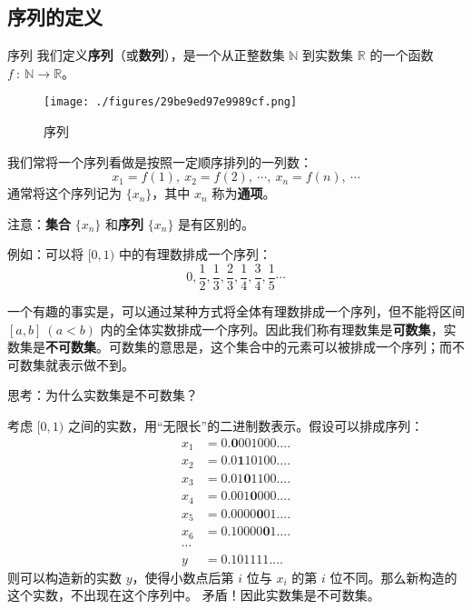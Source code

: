 
\begin{issues}
\issueTODO
\issueDraft
\end{issues}

\subsection{序列的定义}
\begin{definition}{序列}
我们定义\textbf{序列}（或\textbf{数列}），是一个从正整数集 $\mathbb{N}$  到实数集 $\mathbb{R}$ 的一个函数 $f\ :\ \mathbb{N}\rightarrow \mathbb{R}$。
\end{definition}
\begin{figure}[ht]
\centering
\texttt{[image: ./figures/29be9ed97e9989cf.png]}
\caption{序列} \label{fig_seq_1}
\end{figure}
我们常将一个序列看做是按照一定顺序排列的一列数：
$$
x_1=f(1),\ x_2=f(2),\ \cdots,\ x_n=f(n),\ \cdots
$$
通常将这个序列记为 $\{x_n\}$，其中 $x_n$ 称为\textbf{通项}。

注意：\textbf{集合} $\{x_n\}$ 和\textbf{序列} $\{x_n\}$ 是有区别的。

例如：可以将 $[0,1)$ 中的有理数排成一个序列：
$$
0,\frac{1}{2},\frac{1}{3},\frac{2}{3},\frac{1}{4},\frac{3}{4},\frac{1}{5}\cdots
$$

一个有趣的事实是，可以通过某种方式将全体有理数排成一个序列，但不能将区间 $[a,b]\ (a<b)$ 内的全体实数排成一个序列。因此我们称有理数集是\textbf{可数集}，实数集是\textbf{不可数集}。可数集的意思是，这个集合中的元素可以被排成一个序列；而不可数集就表示做不到。

\begin{example}{}
思考：为什么实数集是不可数集？

考虑 $[0,1)$ 之间的实数，用“无限长”的二进制数表示。假设可以排成序列： 
\begin{equation}
\begin{aligned}
x_1&=0.\boldsymbol 0001000....\\
x_2&=0.0\boldsymbol 110100....\\
x_3&=0.01\boldsymbol 01100....\\
x_4&=0.001\boldsymbol 0000....\\
x_5&=0.0000\boldsymbol 001....\\
x_6&=0.10000\boldsymbol 01....\\
\cdots
\\
y&=0.101111....
\end{aligned}
\end{equation}
​则可以构造新的实数 $y$，使得小数点后第 $i$ 位与 $x_i$ 的第 $i$ 位不同。那么新构造的这个实数，不出现在这个序列中。
矛盾！因此实数集是不可数集。
\end{example}

​		

​		
